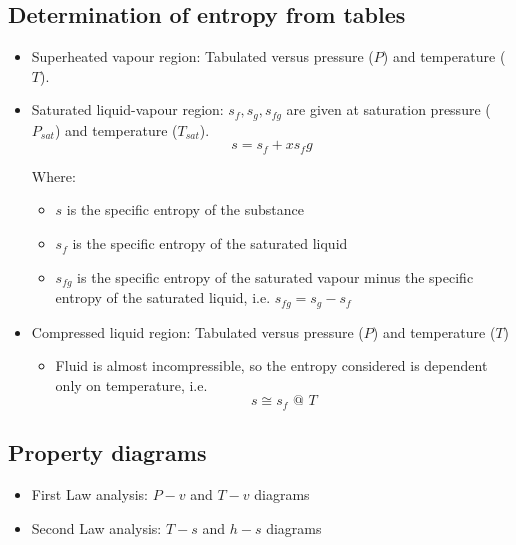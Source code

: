 \documentclass[11pt]{article}
\begin{document}
 \newpage
\subsection{Determination of entropy from tables}
\label{sec:orgf3143a7}
\begin{itemize}
\item Superheated vapour region: Tabulated versus pressure (\(P\)) and temperature (\(T\)).
\item Saturated liquid-vapour region: \(s_f, s_g, s_{fg}\) are given at saturation pressure (\(P_{sat}\)) and temperature (\(T_{sat}\)).
\[s = s_f + xs_fg\]

Where:
\begin{itemize}
\item \(s\) is the specific entropy of the substance
\item \(s_f\) is the specific entropy of the saturated liquid
\item \(s_{fg}\) is the specific entropy of the saturated vapour minus the specific entropy of the saturated liquid, i.e. \(s_{fg} = s_g - s_f\)
\end{itemize}
\item Compressed liquid region: Tabulated versus pressure (\(P\)) and temperature (\(T\))
\begin{itemize}
\item Fluid is almost incompressible, so the entropy considered is dependent only on temperature, i.e.
\[s \cong s_f \text{ @ } T\]
\end{itemize}
\end{itemize}
\subsection{Property diagrams}
\label{sec:orge6836f3}
\begin{itemize}
\item First Law analysis: \(P-v\) and \(T-v\) diagrams
\item Second Law analysis: \(T-s\) and \(h-s\) diagrams
\end{itemize}
\end{document}
